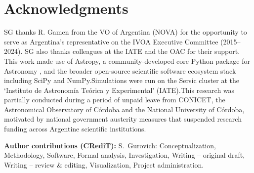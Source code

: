 \documentclass[final,5p,times,twocolumn,authoryear]{elsarticle}
\begin{document}
\section{Acknowledgments}
SG thanks R. Gamen from the VO of Argentina (NOVA) for the opportunity to serve as Argentina's representative on the IVOA Executive Committee (2015–2024). SG also thanks colleagues at the IATE and the OAC for their support. This work made use
of Astropy, a community-developed core Python package for
Astronomy \citep{robitaille_astropy:_2013}, and the broader
open-source scientific software ecosystem stack including SciPy and
NumPy.Simulations were run on the Sersic
cluster at the `Instituto de Astronomía Teórica y Experimental' (IATE).This research was partially conducted during a period of unpaid leave 
from CONICET, the Astronomical Observatory of C\'ordoba and the National University of C\'ordoba, 
motivated by national government austerity measures that suspended research funding across Argentine scientific institutions.
 
\noindent\textbf{Author contributions (CRediT):}
S.~Gurovich: Conceptualization, Methodology, Software,
Formal analysis, Investigation, Writing -- original draft,
Writing -- review \& editing, Visualization,
Project administration.

%


\end{document}
